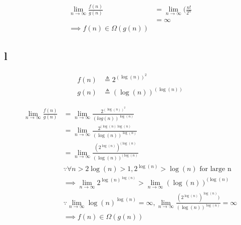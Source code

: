 \begin{align*}
    \lim_{n \to \infty}\frac{f(n)}{g(n)} &= \lim_{n \to \infty}(\frac{n!}{2^n}\\
    &= \infty\\
    \implies f(n) \in \Omega(g(n))
\end{align*}

\subsection*{l}
\begin{align*}
    f(n) &\triangleq 2^{(\log(n))^2}\\
    g(n) &\triangleq (\log(n))^{(\log(n))}
\end{align*}

\begin{align*}
    \lim_{n \to \infty} \frac{f(n)}{g(n)} &= \lim_{n \to \infty} \frac{2^{(\log(n))^{2}}}{(log(n))^{\log(n)}}\\
    &= \lim_{n \to \infty} \frac{2^{(\log(n)\log(n)}}{(\log(n))^{\log(n)}}\\
    &= \lim_{n \to \infty} \frac{(2^{\log(n)})^{(\log(n)}}{(\log(n))^{(\log(n)}}\\
    &\because \forall n > 2 \log(n) > 1, 2^{\log(n)} > \log(n) \text{ for large n}\\
    &\implies \lim_{n \to \infty} 2^{\log(n)}^{\log(n)} > \lim_{n \to \infty} (\log(n))^{(\log(n)}\\
    &\because \lim_{n \to \infty} \log(n)^{\log(n)} = \infty, \lim_{n \to \infty} \frac{(2^{\log(n)})^{\log(n)})}{(\log(n))^{\log(n)}} = \infty\\
    &\implies f(n) \in \Omega(g(n))
\end{align*}
